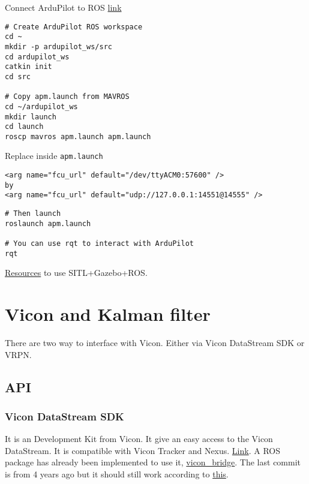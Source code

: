             Connect ArduPilot to ROS \href{http://ardupilot.org/dev/docs/ros-sitl.html}{link}
            \begin{verbatim}
# Create ArduPilot ROS workspace
cd ~
mkdir -p ardupilot_ws/src
cd ardupilot_ws
catkin init
cd src

# Copy apm.launch from MAVROS
cd ~/ardupilot_ws
mkdir launch
cd launch
roscp mavros apm.launch apm.launch
            \end{verbatim}
            
            Replace inside \texttt{apm.launch}
            \begin{verbatim}
<arg name="fcu_url" default="/dev/ttyACM0:57600" />
by
<arg name="fcu_url" default="udp://127.0.0.1:14551@14555" />
            \end{verbatim}
            
            \begin{verbatim}
# Then launch
roslaunch apm.launch

# You can use rqt to interact with ArduPilot
rqt
            \end{verbatim}
            
            \href{https://www.youtube.com/watch?time_continue=253&v=orMXVby-tSI}{Resources} to use SITL+Gazebo+ROS.
    
    
    
    \section{Vicon and Kalman filter}
        There are two way to interface with Vicon. Either via Vicon DataStream SDK or VRPN.
        
        \subsection{API}
            \subsubsection{Vicon DataStream SDK}
                It is an Development Kit from Vicon. It give an easy access to the Vicon DataStream. It is compatible with Vicon Tracker and Nexus. \href{https://www.vicon.com/downloads/utilities-and-sdk/datastream-sdk}{Link}. A ROS package has already been implemented to use it, \href{https://github.com/ethz-asl/vicon_bridge}{vicon\_bridge}.
                The last commit is from 4 years ago but it should still work according to \href{https://answers.ros.org/question/329849/which-ros-package-use-with-vicon/}{this}.
            
